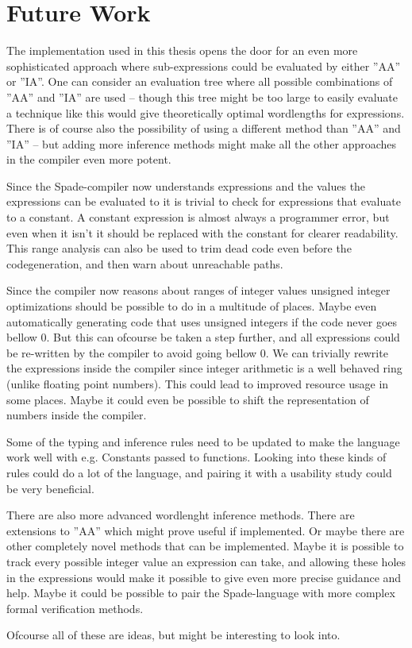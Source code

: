 \section{Future Work}
The implementation used in this thesis opens the door for an even more sophisticated approach where sub-expressions could be evaluated by either ''AA'' or ''IA''. One can consider an evaluation tree where all possible combinations of ''AA'' and ''IA'' are used -- though this tree might be too large to easily evaluate a technique like this would give theoretically optimal wordlengths for expressions. There is of course also the possibility of using a different method than ''AA'' and ''IA'' -- but adding more inference methods might make all the other approaches in the compiler even more potent.

Since the Spade-compiler now understands expressions and the values the expressions can be evaluated to it is trivial to check for expressions that evaluate to a constant. A constant expression is almost always a programmer error, but even when it isn't it should be replaced with the constant for clearer readability. This range analysis can also be used to trim dead code even before the codegeneration, and then warn about unreachable paths.

Since the compiler now reasons about ranges of integer values unsigned integer optimizations should be possible to do in a multitude of places. Maybe even automatically generating code that uses unsigned integers if the code never goes bellow 0. But this can ofcourse be taken a step further, and all expressions could be re-written by the compiler to avoid going bellow 0. We can trivially rewrite the expressions inside the compiler since integer arithmetic is a well behaved ring (unlike floating point numbers). This could lead to improved resource usage in some places. Maybe it could even be possible to shift the representation of numbers inside the compiler.

Some of the typing and inference rules need to be updated to make the language work well with e.g. Constants passed to functions. Looking into these kinds of rules could do a lot of the language, and pairing it with a usability study could be very beneficial.

There are also more advanced wordlenght inference methods. There are extensions to ''AA'' which might prove useful if implemented. Or maybe there are other completely novel methods that can be implemented. Maybe it is possible to track every possible integer value an expression can take, and allowing these holes in the expressions would make it possible to give even more precise guidance and help. Maybe it could be possible to pair the Spade-language with more complex formal verification methods.

Ofcourse all of these are ideas, but might be interesting to look into.

